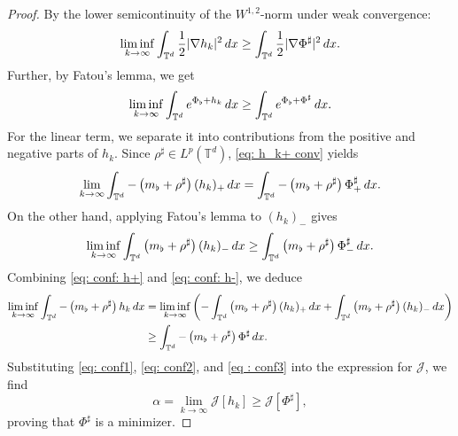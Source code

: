 \documentclass[11pt,reqno,a4paper]{amsart}
\newcommand{\intt}{\int_{\T^d}}
\theoremstyle{definition}
\theoremstyle{remark}
\numberwithin{equation}{section}
\newcommand{\T} {\mathbb T}
\newcommand{\lt}{\left}
\newcommand{\rt}{\right}
\newcommand{\bq}{\begin{equation}}
\newcommand{\eq}{\end{equation}}
\newcommand{\calJ}{\mathcal J}
\newcommand{\dx}{\textnormal{d}x}
\begin{document}
\begin{proof}
By the lower semicontinuity of the $W^{1,2}$-norm under weak convergence:
\begin{equation}
\label{eq: conf1}
\liminf_{k \to \infty} \intt \frac{1}{2}|\nabla h_k|^2\, \dx \ge \intt \frac{1}{2}|\nabla \Phi^\sharp|^2\, \dx.
\end{equation}
Further, by Fatou's lemma, we get
\begin{equation}
\label{eq: conf2}
\liminf_{k \to \infty} \intt e^{\Phi_\flat + h_k}\, \dx \ge  \intt e^{\Phi_\flat+\Phi^\sharp}\, \dx.
\end{equation}
For the linear term, we separate it into contributions from the positive and negative parts of $h_k$. Since $\rho^\sharp \in L^p(\T^d)$, \eqref{eq: h_k+ conv} yields
\begin{equation}
\label{eq: conf: h+}
\lim_{k \to \infty} \intt -\lt(m_\flat + \rho^\sharp \rt) (h_k)_+ \, \dx = \intt -\lt(m_\flat + \rho^\sharp \rt) \Phi^\sharp_+ \, \dx.
\end{equation}
On the other hand, applying Fatou's lemma to $(h_k)_-$ gives
\begin{equation}
\label{eq: conf: h-}
\liminf_{k \to \infty} \intt  \lt(m_\flat + \rho^\sharp \rt) (h_k)_- \,\dx \ge  \intt  \lt(m_\flat + \rho^\sharp \rt) \Phi^\sharp_- \,\dx.
\end{equation}
Combining \eqref{eq: conf: h+} and \eqref{eq: conf: h-}, we deduce
\begin{equation}
\label{eq : conf3}
\begin{split}
    \liminf_{k\to\infty} \intt -\lt(m_\flat + \rho^\sharp \rt) h_k \,\dx &= \liminf_{k\to\infty} \left( -\intt \lt(m_\flat + \rho^\sharp \rt) (h_k)_+ \,\dx + \intt \lt(m_\flat + \rho^\sharp \rt) (h_k)_- \,\dx \right)\\
    &\ge \intt - \lt(m_\flat + \rho^\sharp \rt) \Phi^\sharp \,\dx.
    \end{split}
    \end{equation}
Substituting \eqref{eq: conf1}, \eqref{eq: conf2}, and \eqref{eq : conf3} into the expression for $\calJ$, we find
\bq\label{eq:jmm}
\alpha = \lim_{k\to \infty} \calJ[h_k] \ge \calJ[\Phi^\sharp],
\eq
proving that $\Phi^\sharp$ is a minimizer.

\medskip


\end{proof}
\end{document}
